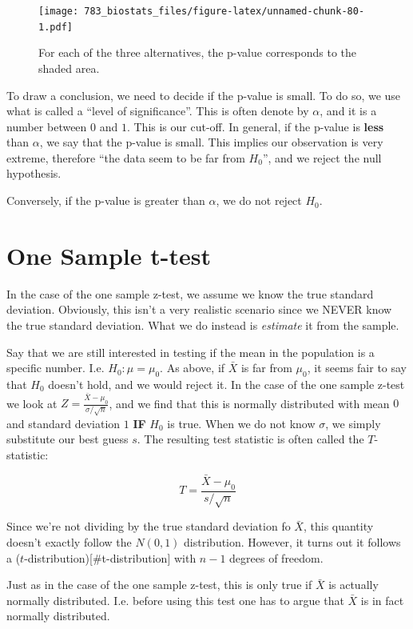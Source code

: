\documentclass[]{book}
\theoremstyle{definition}
\theoremstyle{definition}
\theoremstyle{definition}
\theoremstyle{remark}
\begin{document}
\begin{figure}
\centering
\texttt{[image: 783\_biostats\_files/figure-latex/unnamed-chunk-80-1.pdf]}
\caption{\label{fig:unnamed-chunk-80}For each of the three alternatives, the p-value corresponds to the shaded area.}
\end{figure}

To draw a conclusion, we need to decide if the p-value is small. To do so, we use what is called a ``level of significance''. This is often denote by \(\alpha\), and it is a number between \(0\) and \(1\). This is our cut-off. In general, if the p-value is \textbf{less} than \(\alpha\), we say that the p-value is small. This implies our observation is very extreme, therefore ``the data seem to be far from \(H_0\)'', and we reject the null hypothesis.

Conversely, if the p-value is greater than \(\alpha\), we do not reject \(H_0\).

\hypertarget{one-sample-t-test}{%
\section{One Sample t-test}\label{one-sample-t-test}}

In the case of the one sample z-test, we assume we know the true standard deviation. Obviously, this isn't a very realistic scenario since we NEVER know the true standard deviation. What we do instead is \emph{estimate} it from the sample.

Say that we are still interested in testing if the mean in the population is a specific number. I.e. \(H_0: \mu = \mu_0\). As above, if \(\bar{X}\) is far from \(\mu_0\), it seems fair to say that \(H_0\) doesn't hold, and we would reject it. In the case of the one sample z-test we look at \(Z = \frac{\bar{X} - \mu_0}{\sigma/\sqrt{n}}\), and we find that this is normally distributed with mean \(0\) and standard deviation \(1\) \textbf{IF} \(H_0\) is true. When we do not know \(\sigma\), we simply substitute our best guess \(s\). The resulting test statistic is often called the \(T\)-statistic:

\[
T = \frac{\bar{X} - \mu_0}{s/\sqrt{n}}
\]

Since we're not dividing by the true standard deviation fo \(\bar{X}\), this quantity doesn't exactly follow the \(N(0,1)\) distribution. However, it turns out it follows a (\(t\)-distribution){[}\#t-distribution{]} with \(n-1\) degrees of freedom.

Just as in the case of the one sample z-test, this is only true if \(\bar{X}\) is actually normally distributed. I.e. before using this test one has to argue that \(\bar{X}\) is in fact normally distributed.
\end{document}
